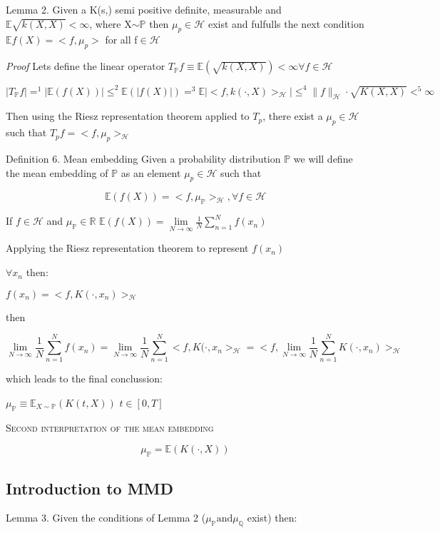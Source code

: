 \documentclass[8pt,a4paper]{article}
\providecommand{\abs}[1]{\lvert#1\rvert}
\providecommand{\norm}[1]{\lVert#1\rVert}
\begin{document}
\textsf{Lemma 2.} Given a K(s,) semi positive definite, measurable and $\mathbb{E}\sqrt{k(X,X)}<\infty$, where X$\sim \mathbb{P}$ then $\mu_{p} \in \mathcal{H}$ exist and fulfulls the next condition
$\mathbb{E}f(X) = <f,\mu_{p}>$ for all f$\in \mathcal{H}$


\textit{Proof} Lets define the linear operator $T_{\mathbb{P}}f\equiv\mathbb{E}(\sqrt{k(X,X)}) < \infty \forall f\in \mathcal{H}$ 

\begin{center}

$|T_{\mathbb{P}}f| =^{1} |\mathbb{E}(f(X))| \leq^{2} \mathbb{E}(|f(X)|) =^{3} \mathbb{E}\abs{<f,k(\cdot,X)>_{\mathcal{H}}} \leq^{4} \norm{f} _{\mathcal{H}}\cdot\sqrt{K(X,X)} <^{5} \infty $

\end{center}
Then using the Riesz representation theorem applied to $T_{p}$, there exist a $\mu_{p}\in \mathcal{H}$ such that $T_{p}f = <f,\mu_{p}>_{\mathcal{H}}$


\textsf{Definition 6. Mean embedding}
Given a probability distribution $\mathbb{P}$ we will define the mean embedding of $\mathbb{P}$ as an element $\mu_{p} \in \mathcal{H}$ such that

$$\mathbb{E}(f(X))=<f,\mu_{\mathbb{P}}>_{\mathcal{H}}, \forall f \in \mathcal{H}$$

If $f\in \mathcal{H}$ and $\mu_{\mathbb{P}} \in \mathbb{R}$
$\mathbb{E}(f(X)) = \lim\limits_{N \to \infty} \frac{1}{N} \sum\limits_{n=1}^{N}f(x_{n})$

Applying the Riesz representation theorem to represent $f(x_{n})$

$\forall x_{n}$ then:

$f(x_{n}) = <f,K(\cdot,x_{n})>_{\mathcal{H}}$


then

$$\lim\limits_{N \to \infty} \frac{1}{N} \sum\limits_{n=1}^{N}f(x_{n}) = \lim\limits_{N \to \infty} \frac{1}{N} \sum\limits_{n=1}^{N} <f,K(\cdot,x_{n}>_{\mathcal{H}} = <f, \lim\limits_{N \to \infty} \frac{1}{N} \sum\limits_{n=1}^{N}K(\cdot,x_{n})>_{\mathcal{H}}$$

which leads to the final conclussion:

$\mu_{\mathbb{P}} \equiv \mathbb{E}_{X\sim \mathbb{P}}(K(t,X))$  $t \in [0,T]$

\textsc{Second interpretation of the mean embedding}

$$\mu_{\mathbb{P}} = \mathbb{E}(K(\cdot,X))$$

\subsection{Introduction to MMD}
\textsf{Lemma 3.} Given the conditions of Lemma 2 ($\mu_{\mathbb{P}} \text{and} \mu_{\mathbb{Q}}$ exist) then:
\end{document}
